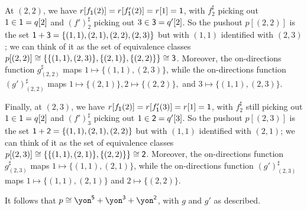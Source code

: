 \documentclass[Book-Poly]{subfiles}
\begin{document}
\begin{exercise}
\begin{solution}
\begin{enumerate}
    At $(2,2)$, we have $r[f_{\textsf{1}}(2)] = r[f'_{\textsf{1}}(2)] = r[1] = \textsf{1}$, with $f^\sharp_2$ picking out $1 \in \textsf{1} = q[2]$ and $(f')^\sharp_2$ picking out $3 \in \textsf{3} = q'[2]$.
    So the pushout $p[(2,2)]$ is the set $\textsf{1} + \textsf{3} = \{(1,1), (2,1), (2,2), (2,3)\}$ but with $(1,1)$ identified with $(2,3)$; we can think of it as the set of equivalence classes $p[(2,2)] \cong \{\{(1,1), (2,3)\}, \{(2,1)\}, \{(2,2)\}\} \cong \textsf{3}$.
    Moreover, the on-directions function $g^\sharp_{(2,2)}$ maps $1 \mapsto \{(1,1), (2,3)\}$, while the on-directions function $(g')^\sharp_{(2,2)}$ maps $1 \mapsto \{(2,1)\}, 2 \mapsto \{(2,2)\},$ and $3 \mapsto \{(1,1), (2,3)\}$.

    Finally, at $(2,3)$, we have $r[f_{\textsf{1}}(2)] = r[f'_{\textsf{1}}(3)] = r[1] = \textsf{1}$, with $f^\sharp_2$ still picking out $1 \in \textsf{1} = q[2]$ and $(f')^\sharp_3$ picking out $1 \in \textsf{2} = q'[3]$.
    So the pushout $p[(2,3)]$ is the set $\textsf{1} + \textsf{2} = \{(1,1), (2,1), (2,2)\}$ but with $(1,1)$ identified with $(2,1)$; we can think of it as the set of equivalence classes $p[(2,3)] \cong \{\{(1,1), (2,1)\}, \{(2,2)\}\} \cong \textsf{2}$.
    Moreover, the on-directions function $g^\sharp_{(2,3)}$ maps $1 \mapsto \{(1,1), (2,1)\}$, while the on-directions function $(g')^\sharp_{(2,3)}$ maps $1 \mapsto \{(1,1), (2,1)\}$ and $2 \mapsto \{(2,2)\}$.

    It follows that $p \iso \yon^\5 + \yon^\3 + \yon^\2$, with $g$ and $g'$ as described.
\end{enumerate}
\end{solution}
\end{exercise}

\end{document}
